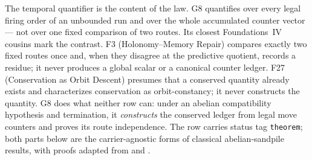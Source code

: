 \documentclass[11pt]{article}
\theoremstyle{definition}
\begin{document}
The temporal quantifier is the content of the law. G8 quantifies over every legal firing order of an
unbounded run and over the whole accumulated counter vector --- not over one fixed comparison of two
routes. Its closest Foundations~IV cousins mark the contrast. F3 (Holonomy--Memory Repair) compares
exactly two fixed routes once and, when they disagree at the predictive quotient, records a residue;
it never produces a global scalar or a canonical counter ledger. F27 (Conservation as Orbit Descent)
presumes that a conserved quantity already exists and characterizes conservation as orbit-constancy;
it never constructs the quantity. G8 does what neither row can: under an abelian compatibility
hypothesis and termination, it \emph{constructs} the conserved ledger from legal move counters and
proves its route independence. The row carries status tag \texttt{theorem}; both parts below are the
carrier-agnostic forms of classical abelian-sandpile results, with proofs adapted from
\citet{Dhar1990} and \citet{FeyLevinePeres2010}.
\end{document}
